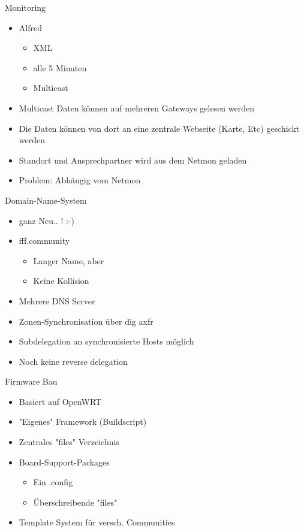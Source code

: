 \begin{frame}{Monitoring}
    \begin{itemize}
        \item Alfred
        \begin{itemize}
            \item XML
            \item alle 5 Minuten
            \item Multicast
        \end{itemize}
        \item Multicast Daten können auf mehreren Gateways gelesen werden
        \item Die Daten können von dort an eine zentrale Webseite (Karte, Etc) geschickt werden
        \item Standort und Ansprechpartner wird aus dem Netmon geladen
        \item Problem: Abhängig vom Netmon
    \end{itemize}
\end{frame}

\begin{frame}{Domain-Name-System}
    \begin{itemize}
        \item ganz Neu.. ! :-)
        \item fff.community
        \begin{itemize}
            \item Langer Name, aber
            \item Keine Kollision
        \end{itemize}
        \item Mehrere DNS Server
        \item Zonen-Synchronisation über dig axfr
        \item Subdelegation an synchronisierte Hosts möglich
        \item Noch keine reverse delegation
    \end{itemize}
\end{frame}

\begin{frame}{Firmware Bau}
    \begin{itemize}
        \item Basiert auf OpenWRT
        \item "Eigenes" Framework (Buildscript)
        \item Zentrales "files" Verzeichnis
        \item Board-Support-Packages
        \begin{itemize}
            \item Ein .config
            \item Überschreibende "files"
        \end{itemize}
        \item Template System für versch. Communities
    \end{itemize}
\end{frame}

